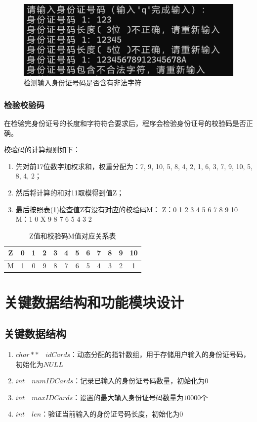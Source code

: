 \documentclass[withoutpreface,bwprint]{cumcmthesis}  %
\begin{document}
	\begin{figure}[ht]
		\centering
		\includegraphics[width=.8\textwidth]{检验字符.png}
		\caption{检测输入身份证号码是否含有非法字符}
		\label{char}
	\end{figure}
	
	\subsubsection{检验校验码}
	在检验完身份证号的长度和字符符合要求后，程序会检验身份证号的校验码是否正确。
	
	
	校验码的计算规则如下：
	\begin{enumerate}
		\item 先对前17位数字加权求和，权重分配为：{7, 9, 10, 5, 8, 4, 2, 1, 6, 3, 
			7, 9, 10, 5, 8, 4, 2}；
		\item 然后将计算的和对11取模得到值Z；
		\item 最后按照表(\ref{Z-M})检查值Z有没有对应的校验码M：
		Z：0 1 2 3 4 5 6 7 8 9 10
		M：1 0 X 9 8 7 6 5 4 3 2
	\end{enumerate}
	
	\begin{table}[h] 
		\centering
		\caption{Z值和校验码M值对应关系表} 
		\begin{tabular}{c|ccccccccccc}  
			\toprule  
			Z & 0 & 1 & 2 & 3 & 4 & 5 & 6 & 7 & 8 & 9 & 10 \\  
			\midrule  
			M & 1 & 0 & 9 & 8 & 7 & 6 & 5 & 4 & 3 & 2 & 1  \\  
			\bottomrule  
		\end{tabular}
		\label{Z-M}  
		
	\end{table}  
	
	
	\section{关键数据结构和功能模块设计}
	
	\subsection{关键数据结构}
	\begin{enumerate}
		\item $char** \quad
		idCards$：动态分配的指针数组，用于存储用户输入的身份证号码，初始化为$NULL$
		\item $int \quad
		numIDCards$：记录已输入的身份证号码数量，初始化为$0$	
		\item $int \quad
		maxIDCards$：设置的最大输入身份证号码数量为$10000$个
		\item $int \quad
		len$：验证当前输入的身份证号码长度，初始化为$0$			
	\end{enumerate}
	
\end{document}
